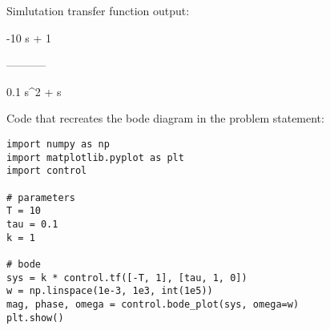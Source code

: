 Simlutation transfer function output:

-10 s + 1

-----------

0.1 s\string^2 + s

Code that recreates the bode diagram in the problem statement:

\begin{verbatim}
import numpy as np
import matplotlib.pyplot as plt
import control

# parameters
T = 10
tau = 0.1
k = 1

# bode
sys = k * control.tf([-T, 1], [tau, 1, 0])
w = np.linspace(1e-3, 1e3, int(1e5))
mag, phase, omega = control.bode_plot(sys, omega=w)
plt.show()
\end{verbatim}